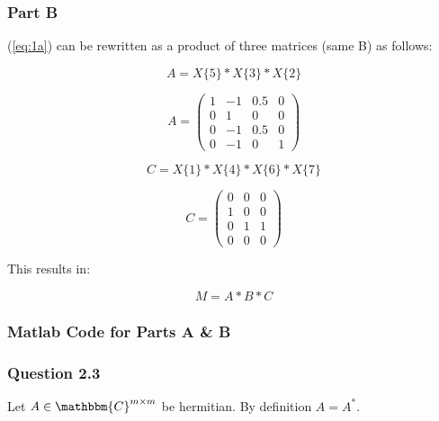 \newpage
\subsubsection{Part B}

(\ref{eq:1a}) can be rewritten as a product of three matrices (same B) as follows:

\begin{equation}
  A = X\{5\}*X\{3\}*X\{2\}
\end{equation}

\begin{equation}
  A = 
  \begin{pmatrix}
    1 & -1 & 0.5 & 0 \\
    0 & 1 & 0 & 0 \\
    0 & -1 & 0.5 & 0\\
    0 & -1 & 0 & 1
  \end{pmatrix}
\end{equation}


\begin{equation}
  C = X\{1\}*X\{4\}*X\{6\}*X\{7\}
\end{equation}

\begin{equation}
  C = 
  \begin{pmatrix}
    0 & 0 & 0 \\
    1 & 0 & 0 \\
    0 & 1 & 1 \\
    0 & 0 & 0
  \end{pmatrix}
\end{equation}


This results in:

\begin{equation}
  \boxed{M = A*B*C}
\end{equation}

\newpage
\subsubsection{Matlab Code for Parts A \& B}


\newpage
\subsubsection{Question 2.3}

Let \(A \in \mathbbm{C}^{m \times m} \) be hermitian.
By definition \(A = A^{*} \).

